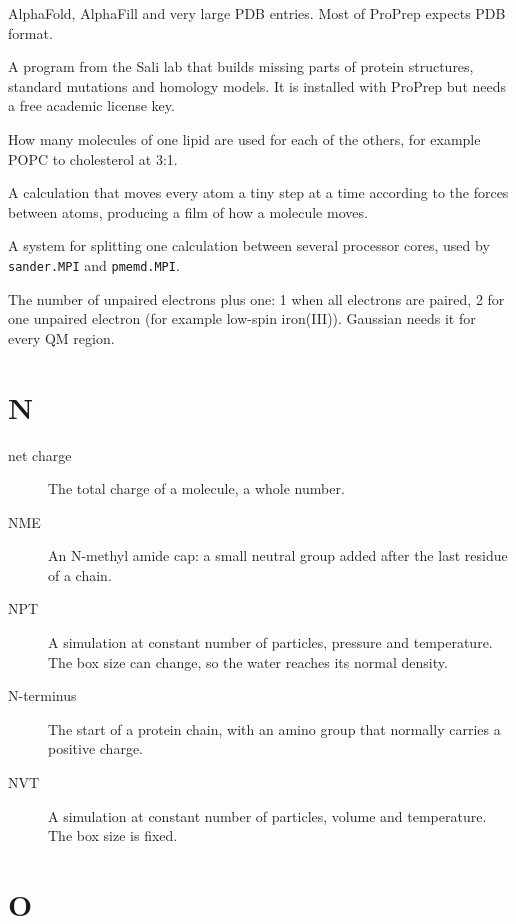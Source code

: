 \begin{description}
  AlphaFold, AlphaFill and very large PDB entries. Most of ProPrep expects PDB
  format.
\item[MODELLER] A program from the Sali lab that builds missing parts of
  protein structures, standard mutations and homology models. It is installed
  with ProPrep but needs a free academic license key.
\item[molar ratio] How many molecules of one lipid are used for each of the
  others, for example POPC to cholesterol at 3:1.
\item[molecular dynamics (MD)] A calculation that moves every atom a tiny step
  at a time according to the forces between atoms, producing a film of how a
  molecule moves.
\item[MPI] A system for splitting one calculation between several processor
  cores, used by \texttt{sander.MPI} and \texttt{pmemd.MPI}.
\item[multiplicity] The number of unpaired electrons plus one: 1 when all
  electrons are paired, 2 for one unpaired electron (for example low-spin
  iron(III)). Gaussian needs it for every QM region.
\end{description}

\section*{N}

\begin{description}
\item[net charge] The total charge of a molecule, a whole number.
\item[NME] An N-methyl amide cap: a small neutral group added after the last
  residue of a chain.
\item[NPT] A simulation at constant number of particles, pressure and
  temperature. The box size can change, so the water reaches its normal
  density.
\item[N-terminus] The start of a protein chain, with an amino group that
  normally carries a positive charge.
\item[NVT] A simulation at constant number of particles, volume and
  temperature. The box size is fixed.
\end{description}

\section*{O}

